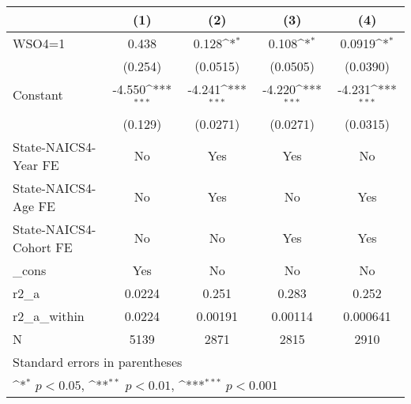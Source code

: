 {
\def\sym#1{\ifmmode^{#1}\else\(^{#1}\)\fi}
\begin{tabular}{l*{4}{c}}
\hline\hline
                    &\multicolumn{1}{c}{(1)}         &\multicolumn{1}{c}{(2)}         &\multicolumn{1}{c}{(3)}         &\multicolumn{1}{c}{(4)}         \\
\hline
WSO4=1              &       0.438         &       0.128\sym{*}  &       0.108\sym{*}  &      0.0919\sym{*}  \\
                    &     (0.254)         &    (0.0515)         &    (0.0505)         &    (0.0390)         \\
[1em]
Constant            &      -4.550\sym{***}&      -4.241\sym{***}&      -4.220\sym{***}&      -4.231\sym{***}\\
                    &     (0.129)         &    (0.0271)         &    (0.0271)         &    (0.0315)         \\
[1em]
State-NAICS4-Year FE&          No         &         Yes         &         Yes         &          No         \\
[1em]
State-NAICS4-Age FE &          No         &         Yes         &          No         &         Yes         \\
[1em]
State-NAICS4-Cohort FE&          No         &          No         &         Yes         &         Yes         \\
[1em]
\_cons              &         Yes         &          No         &          No         &          No         \\
\hline
r2\_a                &      0.0224         &       0.251         &       0.283         &       0.252         \\
r2\_a\_within         &      0.0224         &     0.00191         &     0.00114         &    0.000641         \\
N                   &        5139         &        2871         &        2815         &        2910         \\
\hline\hline
\multicolumn{5}{l}{\footnotesize Standard errors in parentheses}\\
\multicolumn{5}{l}{\footnotesize \sym{*} \(p<0.05\), \sym{**} \(p<0.01\), \sym{***} \(p<0.001\)}\\
\end{tabular}
}
